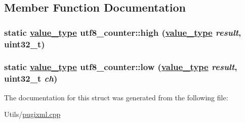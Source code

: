\subsection{Member Function Documentation}
\hypertarget{structutf8__counter_b16e675980a15e1ede2e4cd18d19f7b1}{
\subsubsection[high]{\setlength{\rightskip}{0pt plus 5cm}static \hyperlink{structutf8__counter_db65152c007965c42184614da9c4af1b}{value\_\-type} utf8\_\-counter::high (\hyperlink{structutf8__counter_db65152c007965c42184614da9c4af1b}{value\_\-type} {\em result}, uint32\_\-t)}}
\label{structutf8__counter_b16e675980a15e1ede2e4cd18d19f7b1}


\hypertarget{structutf8__counter_0950643189089175ae0eac9b4193534d}{
\subsubsection[low]{\setlength{\rightskip}{0pt plus 5cm}static \hyperlink{structutf8__counter_db65152c007965c42184614da9c4af1b}{value\_\-type} utf8\_\-counter::low (\hyperlink{structutf8__counter_db65152c007965c42184614da9c4af1b}{value\_\-type} {\em result}, uint32\_\-t {\em ch})}}
\label{structutf8__counter_0950643189089175ae0eac9b4193534d}




The documentation for this struct was generated from the following file:\begin{CompactItemize}
\item 
Utils/\hyperlink{pugixml_8cpp}{pugixml.cpp}\end{CompactItemize}
